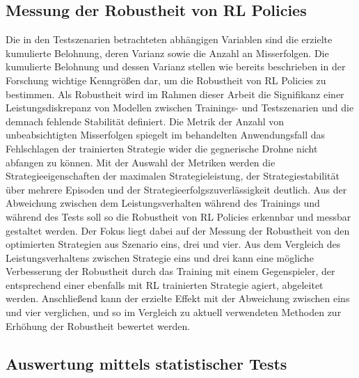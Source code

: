 \subsection{Messung der Robustheit von RL Policies}

Die in den Testszenarien betrachteten abhängigen Variablen sind die erzielte kumulierte Belohnung, deren Varianz sowie die Anzahl an Misserfolgen.
Die kumulierte Belohnung und dessen Varianz stellen wie bereits beschrieben in der Forschung wichtige Kenngrößen dar, um die Robustheit von RL Policies zu bestimmen.
Als Robustheit wird im Rahmen dieser Arbeit die Signifikanz einer Leistungsdiskrepanz von Modellen zwischen Trainings- und Testszenarien und die demnach fehlende Stabilität definiert.
Die Metrik der Anzahl von unbeabsichtigten Misserfolgen spiegelt im behandelten Anwendungsfall das Fehlschlagen der trainierten Strategie wider die gegnerische Drohne nicht abfangen zu können.
Mit der Auswahl der Metriken werden die Strategieeigenschaften der maximalen Strategieleistung, der Strategiestabilität über mehrere Episoden und der Strategieerfolgszuverlässigkeit deutlich.
Aus der Abweichung zwischen dem Leistungsverhalten während des Trainings und während des Tests soll so die Robustheit von RL Policies erkennbar und messbar gestaltet werden.
Der Fokus liegt dabei auf der Messung der Robustheit von den optimierten Strategien aus Szenario eins, drei und vier.
Aus dem Vergleich des Leistungsverhaltens zwischen Strategie eins und drei kann eine mögliche Verbesserung der Robustheit durch das Training mit einem Gegenspieler, der entsprechend einer ebenfalls mit RL trainierten Strategie agiert, abgeleitet werden. 
Anschließend kann der erzielte Effekt mit der Abweichung zwischen eins und vier verglichen, und so im Vergleich zu aktuell verwendeten Methoden zur Erhöhung der Robustheit bewertet werden. 

\subsection{Auswertung mittels statistischer Tests}

